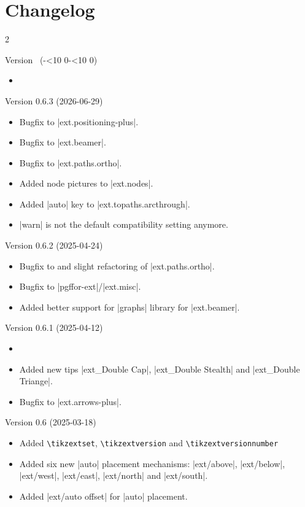 \section*{Changelog}
\begin{multicols}{2}\raggedright
\noindent
Version \tikzextversion\ (\the\year-\ifnum\month<10 0\fi\the\month-\ifnum\day<10 0\fi\the\day)
\begin{itemize}
\item {}
\end{itemize}

Version 0.6.3 (2026-06-29)
\begin{itemize}
\item Bugfix to |ext.positioning-plus|. \cite{GH24}
\item Bugfix to |ext.beamer|.
\item Bugfix to |ext.paths.ortho|.
\item Added node pictures to |ext.nodes|.
\item Added |auto| key to |ext.topaths.arcthrough|.
\item |warn| is not the default compatibility setting anymore.
\end{itemize}
Version 0.6.2 (2025-04-24)
\begin{itemize}
\item Bugfix to and slight refactoring of |ext.paths.ortho|.
\item Bugfix to |pgffor-ext|/|ext.misc|.
\item Added better support for |graphs| library for |ext.beamer|.
\end{itemize}
Version 0.6.1 (2025-04-12)
\begin{itemize}
\item {}
\item Added new tips |ext_Double Cap|, |ext_Double Stealth| and |ext_Double Triange|.
\item Bugfix to |ext.arrows-plus|. \cite{GH18}
\end{itemize}
Version 0.6 (2025-03-18)
\begin{itemize}
\item Added \texttt{\textbackslash tikzextset},
            \texttt{\textbackslash tikzextversion} and
            \texttt{\textbackslash tikzextversionnumber}
\item Added six new |auto| placement mechanisms:
      |ext/above|, |ext/below|, |ext/west|, |ext/east|, |ext/north| and |ext/south|.
\item Added |ext/auto offset| for |auto| placement.

\end{itemize}
\end{multicols}
